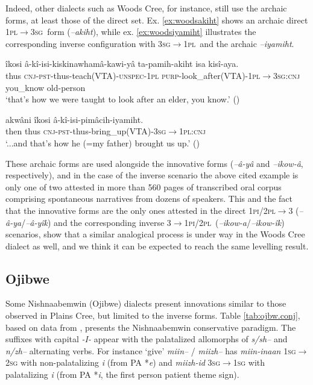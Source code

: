 \documentclass[twoside,a4paper,11pt]{article}
\newcommand{\ipa}[1]{{\phon\textit{#1}}}
\newcommand{\sg}{\textsc{sg}}
\newcommand{\pl}{\textsc{pl}}
\newcommand{\Σ}{\greek{Σ}}
\newcommand{\cnj}{\textsc{cnj}}
\newcommand{\pli}{\textsc{pi}}
\newcommand{\pst}{\textsc{pst}}
\newcommand{\purp}{\textsc{purp}}
\newcommand{\unspec}{\textsc{unspec}}
\begin{document}
Indeed, other dialects such as Woods Cree, for instance, still use the archaic forms, at least those of the direct set. Ex. \ref{ex:woodsakiht} shows an archaic direct 1\pl$\rightarrow$3\sg\ form (\ipa{--akiht}), while ex. \ref{ex:woodsiyamiht} illustrates the corresponding inverse configuration with 3\sg$\rightarrow$1\pl\ and the archaic \ipa{--iyamiht}.

\begin{exe}
\ex \label{ex:woodsakiht}
 \gll îkosi â-kî-isi-kiskinawhamâ-kawi-yâ ta-pamih-akiht isa kisî-aya.\\
thus {\cnj-\pst-thus-teach(VTA)-\unspec-1\pl} {\purp-look\_after(VTA)-1\pl$\rightarrow$3\sg:\cnj} {you\_know} {old-person}\\
\glt `that's how we were taught to look after an elder, you know.' (\citealp[p. 275]{castel})
\end{exe}

\begin{exe}
\ex \label{ex:woodsiyamiht}
 \gll akwâni îkosi â-kî-isi-pimâcih-iyamiht.\\
then thus \cnj-\pst-thus-bring\_up(VTA)-3\sg$\rightarrow$1\pl:\cnj\\
\glt `...and that's how he (=my father)  brought us up.' (\citealp[p. 182]{castel})
\end{exe}

These archaic forms are used alongside the innovative forms (\ipa{--â-yâ} and \ipa{--ikow-â}, respectively), and in the case of the inverse scenario the above cited example is only one of two attested in more than 560 pages of transcribed oral corpus comprising spontaneous narratives from dozens of speakers. This and the fact that the innovative forms are the only ones attested in the direct 1\pli/2\pl$\rightarrow$3 (\ipa{--â-ya}/\ipa{--â-yîk}) and the corresponding inverse 3$\rightarrow$1\pli/2\pl\ (\ipa{--ikow-a}/\ipa{--ikow-îk}) scenarios, show that a similar analogical process is under way in the Woods Cree dialect as well, and we think it can be expected to reach the same levelling result.


\subsection{Ojibwe} \label{subsec:ojibwe}
Some Nishnaabemwin (Ojibwe) dialects  present innovations similar to those observed in Plains Cree, but limited to the inverse forms. Table \ref{tab:ojbw.conj}, based on data from \citet[295]{valentine01grammar}, presents the Nishnaabemwin conservative paradigm. The suffixes with capital \ipa{-I-} appear with the palatalized allomorphs of \ipa{s/sh--} and \ipa{n/zh--} alternating verbs. For instance `give' \ipa{miin--} / \ipa{miizh--} has \ipa{miin-inaan} 1\sg{}$\rightarrow$2\sg{} with non-palatalizing \ipa{i} (from PA *\ipa{e}) and \ipa{miizh-id} 3\sg{}$\rightarrow$1\sg{} with palatalizing \ipa{i} (from PA *\ipa{i}, the first person patient theme sign).
\end{document}
